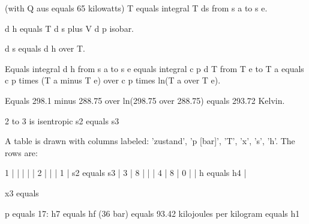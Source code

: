 (with Q aus equals 65 kilowatts)
T equals integral T ds from s a to s e.

d h equals T d s plus V d p isobar.

d s equals d h over T.

Equals integral d h from s a to s e equals integral c p d T from T e to T a equals c p times (T a minus T e) over c p times ln(T a over T e).

Equals 298.1 minus 288.75 over ln(298.75 over 288.75) equals 293.72 Kelvin.

2 to 3 is isentropic  
s2 equals s3

A table is drawn with columns labeled: 'zustand', 'p [bar]', 'T', 'x', 's', 'h'. The rows are:

1 | | | | |  
2 | | | 1 | s2 equals s3 |  
3 | 8 | | |  
4 | 8 | 0 | | h equals h4 |

x3 equals

p equals 17: h7 equals hf (36 bar) equals 93.42 kilojoules per kilogram equals h1